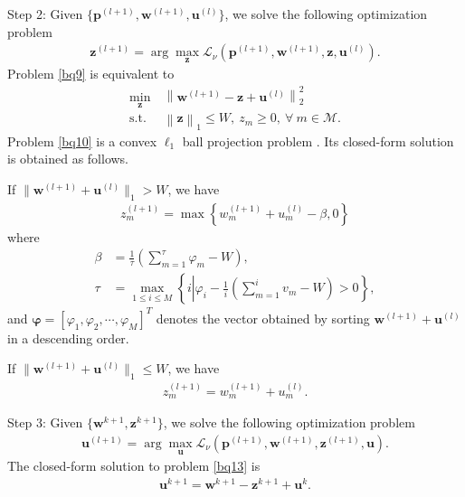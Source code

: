 \documentclass[journal]{IEEEtran}
\begin{document}
Step 2: Given $\{\mathbf{p}^{(l+1)}, \mathbf{w}^{(l+1)}, \mathbf{u}^{(l)}\}$, we solve the following optimization problem
\begin{align}\label{bq9}
\mathbf{z}^{(l+1)}=\arg\max_{\mathbf{z}} \mathcal{L}_\nu\left(\mathbf{p}^{(l+1)}, \mathbf{w}^{(l+1)}, \mathbf{z}, \mathbf{u}^{(l)}\right).
\end{align}
Problem \eqref{bq9} is equivalent to
\begin{align}\label{bq10}
\min_{\mathbf{z}}\ & \left\|\mathbf{w}^{(l+1)}-\mathbf{z}+\mathbf{u}^{(l)} \right\|_2^2 \\ \mbox{s.t.} \ & \left\|\mathbf{z} \right\|_1 \leq W,\  z_m\geq 0,\ \forall\ m\in\mathcal{M}.
\end{align}
Problem \eqref{bq10} is a convex $\ell_1$ ball projection problem \cite{JDuchi}. Its closed-form solution is obtained as follows.

If $\|\mathbf{w}^{(l+1)}+\mathbf{u}^{(l)}\|_1 > W$, we have
\begin{align} \label{bq11}
z_m^{(l+1)}= \max\left\{w_m^{(l+1)}+u_m^{(l)}-\beta, 0\right\}
\end{align}
where
\begin{align}
\beta&=\frac{1}{\tau}\left(\sum\limits_{m=1}^{\tau} \varphi_m - W\right),\\
\tau&= \max_{1 \leq i \leq M} \left\{ i \left|\varphi_i - \frac{1}{i}\left(\sum\limits_{m=1}^{i} v_m - W\right) > 0 \right. \right\},
\end{align}
and $\bm{\varphi} = \left[\varphi_1, \varphi_2, \cdots, \varphi_M\right]^T$
denotes the vector obtained by sorting $\mathbf{w}^{(l+1)}+\mathbf{u}^{(l)}$ in a descending order.

If $\|\mathbf{w}^{(l+1)}+\mathbf{u}^{(l)}\|_1 \leq W$, we have
\begin{align}
z_m^{(l+1)}=w_m^{(l+1)}+u_m^{(l)}.
\end{align}

Step 3: Given $\{\mathbf{w}^{k+1}, \mathbf{z}^{k+1}\}$, we solve the following optimization problem
\begin{align}\label{bq13}
\mathbf{u}^{(l+1)}=\arg\max_{\mathbf{u}} \mathcal{L}_\nu\left(\mathbf{p}^{(l+1)}, \mathbf{w}^{(l+1)}, \mathbf{z}^{(l+1)}, \mathbf{u}\right).
\end{align}
The closed-form solution to problem \eqref{bq13} is
\begin{align} \label{q24}
\mathbf{u}^{k+1} =\mathbf{w}^{k+1} - \mathbf{z}^{k+1} + \mathbf{u}^k.
\end{align}
\end{document}
